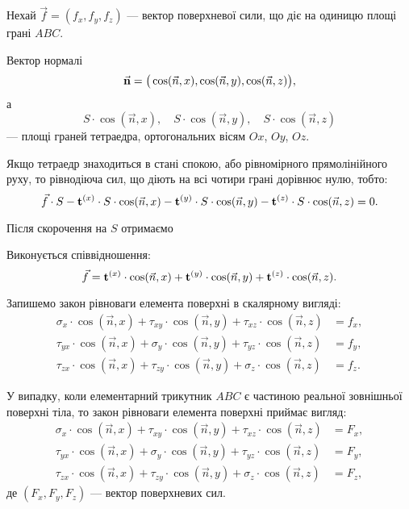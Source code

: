 Нехай $\vec f = (f_x, f_y, f_z)$ --- вектор поверхневої сили, що діє на одиницю площі грані $ABC$. \medskip

Вектор нормалі
\begin{equation}
	\vec{\bf{n}} = \big( \cos( \vec n, x ), \cos ( \vec n, y ), \cos ( \vec n, z ) \big),
\end{equation}
а
\begin{equation}
	S \cdot \cos (\vec n, x ), \quad S \cdot \cos (\vec n, y ), \quad S \cdot \cos (\vec n, z) 	
\end{equation} 
--- площі граней тетраедра, ортогональних вісям $Ox$, $Oy$, $Oz$. \medskip

Якщо тетраедр знаходиться в стані спокою, або рівномірного прямолінійного руху, то рівнодіюча сил, що діють на всі чотири грані дорівнює нулю, тобто: 
\begin{equation}
	\vec f \cdot S - \bf{t}^{(x)} \cdot S \cdot \cos ( \vec n, x) - \bf{t}^{(y)} \cdot S \cdot \cos ( \vec n, y) - \bf{t}^{(z)} \cdot S \cdot \cos ( \vec n, z) = 0.
\end{equation}

Після скорочення на $S$ отримаємо
\begin{theorem}
	Виконується співвідношення:
	\begin{equation}
		\vec f = \bf{t}^{(x)} \cdot \cos ( \vec n, x) + \bf{t}^{(y)} \cdot \cos ( \vec n, y) + \bf{t}^{(z)} \cdot \cos ( \vec n, z).
	\end{equation}
\end{theorem}

Запишемо закон рівноваги елемента поверхні в скалярному вигляді:
\begin{align}
	\sigma_x \cdot \cos ( \vec n, x ) + \tau_{xy} \cdot \cos ( \vec n, y ) + \tau_{xz} \cdot \cos ( \vec n, z ) &= f_x, \\
	\tau_{yx} \cdot \cos ( \vec n, x ) + \sigma_y \cdot \cos ( \vec n, y ) + \tau_{yz} \cdot \cos ( \vec n, z ) &= f_y, \\
	\tau_{zx} \cdot \cos ( \vec n, x ) + \tau_{zy} \cdot \cos ( \vec n, y ) + \sigma_z \cdot \cos ( \vec n, z ) &= f_z.
\end{align}

У випадку, коли елементарний трикутник $ABC$ є частиною реальної зовнішньої поверхні тіла, то закон рівноваги елемента поверхні приймає вигляд:
\begin{align}
	\sigma_x \cdot \cos ( \vec n, x ) + \tau_{xy} \cdot \cos ( \vec n, y ) + \tau_{xz} \cdot \cos ( \vec n, z ) &= F_x, \\
	\tau_{yx} \cdot \cos ( \vec n, x ) + \sigma_y \cdot \cos ( \vec n, y ) + \tau_{yz} \cdot \cos ( \vec n, z ) &= F_y, \\
	\tau_{zx} \cdot \cos ( \vec n, x ) + \tau_{zy} \cdot \cos ( \vec n, y ) + \sigma_z \cdot \cos ( \vec n, z ) &= F_z,
\end{align}
де $(F_x, F_y, F_z)$ --- вектор поверхневих сил. \medskip

